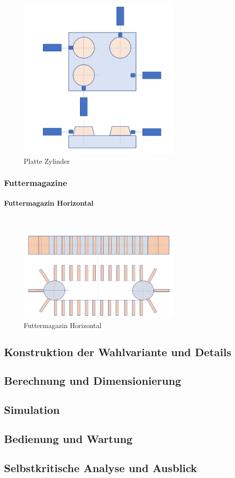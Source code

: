 \documentclass[a4paper,12pt]{scrartcl}
\begin{document}
\begin{figure}[H]
\begin{center}
\includegraphics[width=8cm]{Bilder/Powerpoint/Platte_Zylinder}
\caption{Platte Zylinder}
\end{center}
\end{figure}

\subsubsection{Futtermagazine}

\paragraph{Futtermagazin Horizontal}$~~$\\ 

\begin{figure}[H]
\begin{center}
\includegraphics[width=8cm]{Bilder/Powerpoint/Futtermagazin_horizontal}
\caption{Futtermagazin Horizontal}
\end{center}
\end{figure}

\subsection{Konstruktion der Wahlvariante und Details}
\subsection{Berechnung und Dimensionierung}
\subsection{Simulation}
\subsection{Bedienung und Wartung}
\subsection{Selbstkritische Analyse und Ausblick}
\end{document}
